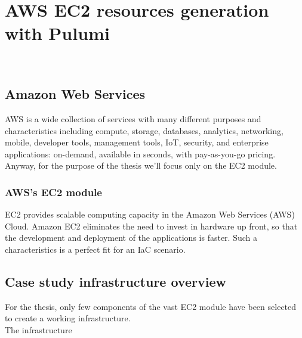 
\chapter{AWS EC2 resources generation with Pulumi}
\label{cap:case-study}

\\

\section{Amazon Web Services}
AWS is a wide collection of services with many different purposes and characteristics including compute, storage, databases, analytics, networking, mobile, developer tools, management tools, IoT, security, and enterprise applications: on-demand, available in seconds, with pay-as-you-go pricing.
Anyway, for the purpose of the thesis we'll focus only on the EC2 module.

\subsection{AWS's EC2 module}
EC2 provides scalable computing capacity in the Amazon Web Services (AWS) Cloud.
Amazon EC2 eliminates the need to invest in hardware up front, so that the development and deployment of the applications is faster.
Such a characteristics is a perfect fit for an IaC scenario.

\section{Case study infrastructure overview}
For the thesis, only few components of the vast EC2 module have been selected to create a working infrastructure.\\
The infrastructure

